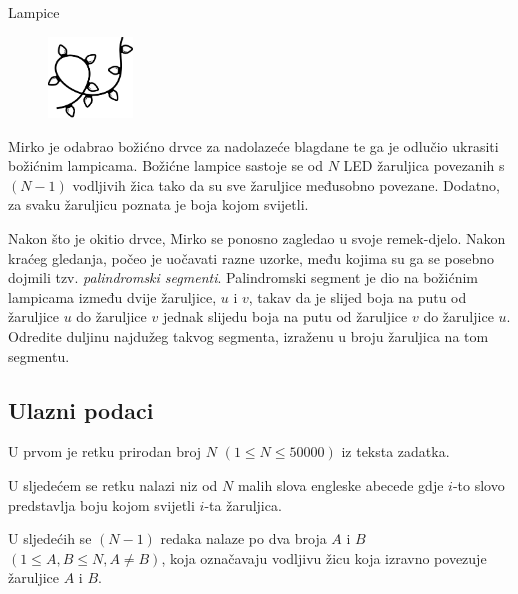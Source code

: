 \begin{statement}[
  problempoints=110,
  timelimit=1 sekunda,
  memorylimit=512 MiB,
]{Lampice}

\setlength\intextsep{-0.1cm}
\begin{figure}
\centering
\includegraphics[width=0.2\textwidth]{img/lampice.png}
\end{figure}

Mirko je odabrao božićno drvce za nadolazeće blagdane te ga je odlučio ukrasiti
božićnim lampicama. Božićne lampice sastoje se od $N$ LED žaruljica povezanih s
$(N - 1)$ vodljivih žica tako da su sve žaruljice međusobno povezane. Dodatno,
za svaku žaruljicu poznata je boja kojom svijetli.

Nakon što je okitio drvce, Mirko se ponosno zagledao u svoje remek-djelo. Nakon
kraćeg gledanja, počeo je uočavati razne uzorke, među kojima su ga se posebno
dojmili tzv. \textit{palindromski segmenti}. Palindromski segment je dio na
božićnim lampicama između dvije žaruljice, $u$ i $v$, takav da je slijed boja na
putu od žaruljice $u$ do žaruljice $v$ jednak slijedu boja na putu od žaruljice
$v$ do žaruljice $u$.
Odredite duljinu najdužeg takvog segmenta, izraženu u broju žaruljica na tom
segmentu.


\subsection*{Ulazni podaci}
U prvom je retku prirodan broj $N$ $(1 \le N \le 50 000)$ iz teksta zadatka.

U sljedećem se retku nalazi niz od $N$ malih slova engleske abecede gdje $i$-to
slovo predstavlja boju kojom svijetli $i$-ta žaruljica.

U sljedećih se $(N - 1)$ redaka nalaze po dva broja $A$ i $B$
$(1 \le A, B \le N, A \neq B)$,
koja označavaju vodljivu žicu koja izravno povezuje žaruljice $A$ i $B$.


\end{statement}
